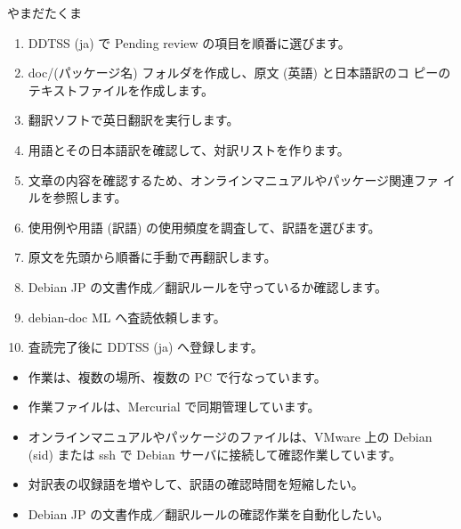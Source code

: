 \begin{prework}{やまだたくま}

 \begin{enumerate}
  \item DDTSS (ja) で Pending review の項目を順番に選びます。
  \item doc/(パッケージ名) フォルダを作成し、原文 (英語) と日本語訳のコ
	ピーのテキストファイルを作成します。
  \item 翻訳ソフトで英日翻訳を実行します。
  \item 用語とその日本語訳を確認して、対訳リストを作ります。
  \item 文章の内容を確認するため、オンラインマニュアルやパッケージ関連ファ
	イルを参照します。
  \item 使用例や用語 (訳語) の使用頻度を調査して、訳語を選びます。
  \item 原文を先頭から順番に手動で再翻訳します。
  \item Debian JP の文書作成／翻訳ルールを守っているか確認します。
  \item debian-doc ML へ査読依頼します。
  \item 査読完了後に DDTSS (ja) へ登録します。
 \end{enumerate}

 \begin{itemize} 
  \item 作業は、複数の場所、複数の PC で行なっています。
  \item 作業ファイルは、Mercurial で同期管理しています。
  \item オンラインマニュアルやパッケージのファイルは、VMware 上の Debian
	(sid) または ssh で Debian サーバに接続して確認作業しています。
 \end{itemize}


 \begin{itemize} 
  \item 対訳表の収録語を増やして、訳語の確認時間を短縮したい。
  \item Debian JP の文書作成／翻訳ルールの確認作業を自動化したい。
 \end{itemize}

\end{prework}

